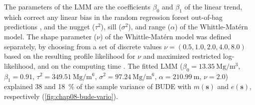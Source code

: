 The parameters of the LMM are the coefficients $\beta_0$ and $\beta_1$ of the linear trend, which correct 
any linear bias in the random regression forest out-of-bag predictions \cite{LiawEtAl2002}, and the nugget 
($\tau^2$), sill ($\sigma^2$), and range ($\alpha$) of the Whittle-Matérn model. The shape parameter 
($\nu$) of the Whittle-Matérn model was defined separately, by choosing from a set of discrete values 
$\nu = (0.5, 1.0, 2.0, 4.0, 8.0)$ based on the resulting profile likelihood for $\nu$ and maximized restricted 
log-likelihood, and on the computing time \cite{Stein1999, DiggleEtAl2007}. The fitted LMM 
($\beta_0 = \SI{13.35}{\mega\gram\per\cubic\metre}$, $\beta_1 = 0.91$, 
$\tau^2 = \SI{349.51}{\mega\gram\per\metre\tothe{6}}$, $\sigma^2 = \SI{97.24}{\mega\gram\per\metre\tothe{6}}$, 
$\alpha = \SI{210.99}{\metre}$, $\nu = 2.0$) explained \num{38} and \SI{18}{\percent} of the sample variance 
of 
BUDE with $m(\boldsymbol{s})$ and $e(\boldsymbol{s})$, respectively (\autoref{fig:chap08-bude-vario}).

